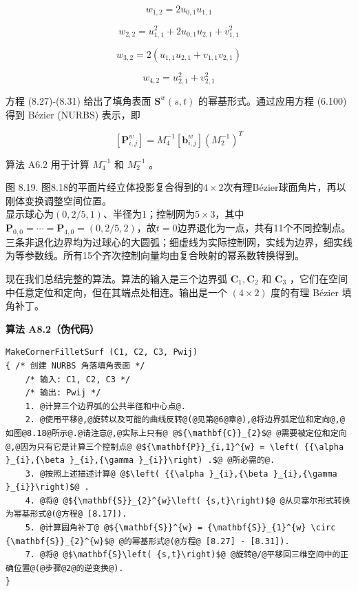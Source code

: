 \documentclass[../main.tex]{subfiles}
\begin{document}
\[
{w}_{1,2} = 2{u}_{0,1}{u}_{1,1}
\]

\[
{w}_{2,2} = {u}_{1,1}^{2} + 2{u}_{0,1}{u}_{2,1} + {v}_{1,1}^{2}
\]

\[
{w}_{3,2} = 2\left( {{u}_{1,1}{u}_{2,1} + {v}_{1,1}{v}_{2,1}}\right)
\]

\[
{w}_{4,2} = {u}_{2,1}^{2} + {v}_{2,1}^{2} \tag{8.31}
\]

方程 (8.27)-(8.31) 给出了填角表面 \({\mathbf{S}}^{w}\left( {s,t}\right)\) 的幂基形式。通过应用方程 (6.100) 得到 Bézier (NURBS) 表示，即

\[
\left\lbrack  {\mathbf{P}}_{i,j}^{w}\right\rbrack   = {M}_{4}^{-1}\left\lbrack  {\mathbf{b}}_{i,j}^{w}\right\rbrack  {\left( {M}_{2}^{-1}\right) }^{T} \tag{8.32}
\]

算法 A6.2 用于计算 \({M}_{4}^{-1}\) 和 \({M}_{2}^{-1}\) 。



\begin{center}
\begin{minipage}{30cm}
\vspace*{.6\baselineskip}
\centering
{}
\par\smallskip
图 8.19. 图8.18的平面片经立体投影复合得到的$4\times2$次有理Bézier球面角片，再以刚体变换调整空间位置。\\
显示球心为$(0,2/5,1)$、半径为1；控制网为$5\times3$，其中$\mathbf P_{0,0}=\cdots=\mathbf P_{4,0}=(0,2/5,2)$，故$t=0$边界退化为一点，共有11个不同控制点。\\
三条非退化边界均为过球心的大圆弧；细虚线为实际控制网，实线为边界，细实线为等参数线。所有15个齐次控制向量均由复合映射的幂系数转换得到。
\end{minipage}
\end{center}

现在我们总结完整的算法。算法的输入是三个边界弧 \({\mathbf{C}}_{1},{\mathbf{C}}_{2}\) 和 \({\mathbf{C}}_{3}\) ，它们在空间中任意定位和定向，但在其端点处相连。输出是一个 \(\left( {4 \times  2}\right)\) 度的有理 Bézier 填角补丁。

\par\medskip\noindent\textbf{算法 A8.2（伪代码）}\par
\begin{verbatim}
MakeCornerFilletSurf (C1, C2, C3, Pwij)
{ /* 创建 NURBS 角落填角表面 */
    /* 输入: C1, C2, C3 */
    /* 输出: Pwij */
    1. @计算三个边界弧的公共半径和中心点@.
    2. @使用平移@,@旋转以及可能的曲线反转@(@见第@6@章@),@将边界弧定位和定向@,@如图@8.18@所示@.@请注意@,@实际上只有@ @${\mathbf{C}}_{2}$@ @需要被定位和定向@,@因为只有它是计算三个控制点@ @${\mathbf{P}}_{i,1}^{w} = \left( {{\alpha }_{i},{\beta }_{i},{\gamma }_{i}}\right) .$@ @所必需的@.
    3. @按照上述描述计算@ @$\left( {{\alpha }_{i},{\beta }_{i},{\gamma }_{i}}\right)$@ .
    4. @将@ @${\mathbf{S}}_{2}^{w}\left( {s,t}\right)$@ @从贝塞尔形式转换为幂基形式@(@方程@ [8.17]).
    5. @计算圆角补丁@ @${\mathbf{S}}^{w} = {\mathbf{S}}_{1}^{w} \circ {\mathbf{S}}_{2}^{w}$@ @的幂基形式@(@方程@ [8.27] - [8.31]).
    7. @将@ @$\mathbf{S}\left( {s,t}\right)$@ @旋转@/@平移回三维空间中的正确位置@(@步骤@2@的逆变换@).
}
\end{verbatim}
\end{document}
